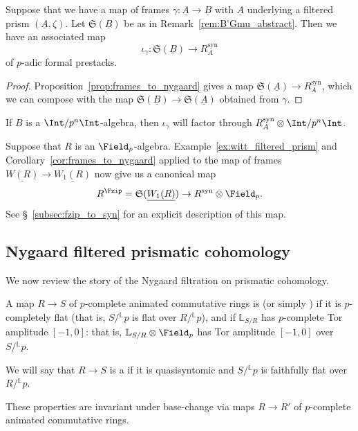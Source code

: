 \documentclass[10pt]{amsart}
\begin{document}
\begin{corollary}
\label{cor:frames_to_nygaard}
Suppose that we have a map of frames $\gamma:\underline{A}\to \underline{B}$ with $\underline{A}$ underlying a filtered prism $(\underline{A},\zeta)$. Let $\mathfrak{S}(\underline{B})$ be as in Remark~\ref{rem:B'Gmu_abstract}. Then we have an associated map
\[
\iota_{\gamma}:\mathfrak{S}(\underline{B})\to R_A^{\mathrm{syn}}
\]
of $p$-adic formal prestacks.
\end{corollary}
\begin{proof}
Proposition~\ref{prop:frames_to_nygaard} gives a map $\mathfrak{S}(\underline{A})\to R_A^{\mathrm{syn}}$, which we can compose with the map $\mathfrak{S}(\underline{B})\to \mathfrak{S}(\underline{A})$ obtained from $\gamma$.
\end{proof} 


\begin{remark}
\label{rem:iota_gamma_mod-pn}
If $B$ is a $\Int/p^n\Int$-algebra, then $\iota_\gamma$ will factor through $R_A^{\mathrm{syn}}\otimes\Int/p^n\Int$.
\end{remark} 

\begin{example}
   \label{ex:witt_frame_to_syntomification}
Suppose that $R$ is an $\Field_p$-algebra. Example~\ref{ex:witt_filtered_prism} and Corollary~\ref{cor:frames_to_nygaard} applied to the map of frames $\underline{W(R)}\to \underline{W_1(R)}$ now give us a canonical map
\[
   R^{\Fzip} = \mathfrak{S}(\underline{W_1(R)})\to R^{\mathrm{syn}}\otimes\Field_p.
\]
See \S~\ref{subsec:fzip_to_syn} for an explicit description of this map.
\end{example}

\subsection{Nygaard filtered prismatic cohomology}
\label{subsec:nygaard_filtered_affineness}


We now review the story of the Nygaard filtration on prismatic cohomology.

\begin{definition}
A map $R\to S$ of $p$-complete animated commutative rings is  (or simply ) if it is $p$-completely flat (that is, $S/{}^{\mathbb{L}}p$ is flat over $R/{}^{\mathbb{L}}p$), and if $\mathbb{L}_{S/R}$ has $p$-complete Tor amplitude $[-1,0]$: that is, $\mathbb{L}_{S/R}\otimes\Field_p$ has Tor amplitude $[-1,0]$ over $S/{}^{\mathbb{L}}p$.

We will say that $R\to S$ is a  if it is quasisyntomic and $S/{}^{\mathbb{L}}p$ is faithfully flat over $R/{}^{\mathbb{L}}p$.

These properties are invariant under base-change via maps $R\to R'$ of $p$-complete animated commutative rings.
\end{definition}
\end{document}
